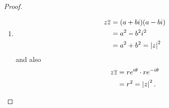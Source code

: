 \documentclass[../MathsNotesBase.tex]{subfiles}
\begin{document}
{\begin{proof}
\begin{enumerate}[label=(\roman*)]
{					\[\begin{aligned}
						\overline{\left(\frac{z}{w}\right)} &= \overline{ \left(\frac{z \, \overline{w}}{w \, \overline{w}}\right) } \nn
						&= \overline{ \left(\frac{z \, \overline{w}}{\abs{w}}\right) } = \frac{\overline{z} \, w}{\abs{w}} \nn
						&= \frac{\overline{z} \, w}{w \, \overline{w}} = \frac{\overline{z}}{\overline{w}} \nn
					\end{aligned}\]
				}
				\item{
					\[\begin{aligned}
						z \overline{z} &= (a + bi)(a - bi) \\
						&= a^2 - b^2 i^2 \\
						&= a^2 + b^2 = \left\lvert z\right\rvert^2
					\end{aligned}\]
					and also
					\[\begin{aligned}
						z \overline{z} &= re^{i\theta} \cdot re^{-i\theta} \\
						&= r^2 = \left\lvert z\right\rvert^2.
					\end{aligned}\]
				}
			\end{enumerate}
		\end{proof}
		
	}
		
		
\end{document}
